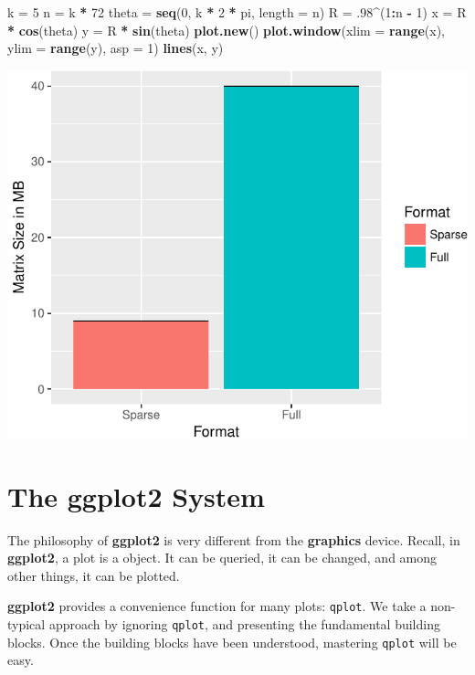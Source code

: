 \documentclass[]{book}
\newenvironment{Shaded}{\begin{snugshade}}{\end{snugshade}}
\newcommand{\DataTypeTok}[1]{\textcolor[rgb]{0.13,0.29,0.53}{#1}}
\newcommand{\DecValTok}[1]{\textcolor[rgb]{0.00,0.00,0.81}{#1}}
\newcommand{\FloatTok}[1]{\textcolor[rgb]{0.00,0.00,0.81}{#1}}
\newcommand{\KeywordTok}[1]{\textcolor[rgb]{0.13,0.29,0.53}{\textbf{#1}}}
\newcommand{\NormalTok}[1]{#1}
\newcommand{\OperatorTok}[1]{\textcolor[rgb]{0.81,0.36,0.00}{\textbf{#1}}}
\newcommand{\StringTok}[1]{\textcolor[rgb]{0.31,0.60,0.02}{#1}}
\theoremstyle{definition}
\theoremstyle{definition}
\theoremstyle{definition}
\theoremstyle{remark}
\begin{document}
\begin{Shaded}
\begin{Highlighting}[]
\NormalTok{k =}\StringTok{ }\DecValTok{5}
\NormalTok{n =}\StringTok{ }\NormalTok{k }\OperatorTok{*}\StringTok{ }\DecValTok{72}
\NormalTok{theta =}\StringTok{ }\KeywordTok{seq}\NormalTok{(}\DecValTok{0}\NormalTok{, k }\OperatorTok{*}\StringTok{ }\DecValTok{2} \OperatorTok{*}\StringTok{ }\NormalTok{pi, }\DataTypeTok{length =}\NormalTok{ n)}
\NormalTok{R =}\StringTok{ }\FloatTok{.98}\OperatorTok{^}\NormalTok{(}\DecValTok{1}\OperatorTok{:}\NormalTok{n }\OperatorTok{-}\StringTok{ }\DecValTok{1}\NormalTok{)}
\NormalTok{x =}\StringTok{ }\NormalTok{R }\OperatorTok{*}\StringTok{ }\KeywordTok{cos}\NormalTok{(theta)}
\NormalTok{y =}\StringTok{ }\NormalTok{R }\OperatorTok{*}\StringTok{ }\KeywordTok{sin}\NormalTok{(theta)}
\KeywordTok{plot.new}\NormalTok{()}
\KeywordTok{plot.window}\NormalTok{(}\DataTypeTok{xlim =} \KeywordTok{range}\NormalTok{(x), }\DataTypeTok{ylim =} \KeywordTok{range}\NormalTok{(y), }\DataTypeTok{asp =} \DecValTok{1}\NormalTok{)}
\KeywordTok{lines}\NormalTok{(x, y)}
\end{Highlighting}
\end{Shaded}

\includegraphics[width=0.5\linewidth]{Rcourse_files/figure-latex/unnamed-chunk-284-1}

\hypertarget{the-ggplot2-system}{%
\section{The ggplot2 System}\label{the-ggplot2-system}}

The philosophy of \textbf{ggplot2} is very different from the \textbf{graphics} device.
Recall, in \textbf{ggplot2}, a plot is a object.
It can be queried, it can be changed, and among other things, it can be plotted.

\textbf{ggplot2} provides a convenience function for many plots: \texttt{qplot}.
We take a non-typical approach by ignoring \texttt{qplot}, and presenting the fundamental building blocks.
Once the building blocks have been understood, mastering \texttt{qplot} will be easy.
\end{document}
